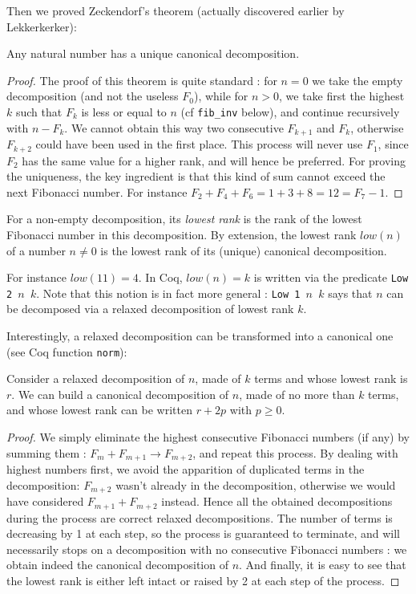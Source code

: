 \documentclass[a4paper,11pt]{article}
\begin{document}
Then we proved Zeckendorf's theorem (actually discovered earlier by Lekkerkerker):

\begin{theorem}[Zeckendorf]\label{zeck}
Any natural number has a unique canonical decomposition.
\end{theorem}

\begin{proof}
The proof of this theorem is quite standard : for $n=0$ we take
the empty decomposition (and not the useless $F_0$), while for
$n>0$, we take first the highest $k$ such that $F_k$ is less or equal to $n$
(cf {\tt fib\_inv} below),
and continue recursively with $n-F_k$. We cannot obtain this way
two consecutive $F_{k+1}$ and $F_k$, otherwise $F_{k+2}$ could have
been used in the first place. This process will never use $F_1$,
since $F_2$ has the same value for a higher rank, and will hence
be preferred.
For proving the uniqueness, the key ingredient is that this kind of
sum cannot exceed the next Fibonacci number. For instance
$F_2+F_4+F_6 = 1+3+8 = 12 = F_7 - 1$.
\end{proof}

\begin{definition}
For a non-empty decomposition, its \emph{lowest rank} is the rank of
the lowest Fibonacci number in this decomposition. By extension,
the lowest rank $low(n)$ of a number $n\neq 0$ is the lowest
rank of its (unique) canonical decomposition.
\end{definition}
For instance $low(11)=4$. In Coq, $low(n)=k$ is written
via the predicate {\tt Low 2 $n$ $k$}. Note that this notion is
in fact more general : {\tt Low 1 $n$ $k$} says that $n$ can be
decomposed via a relaxed decomposition of lowest rank $k$.

Interestingly, a relaxed decomposition can be transformed into
a canonical one (see Coq function {\tt norm}):

\begin{theorem}[normalization]\label{norm}
Consider a relaxed decomposition of $n$, made of $k$ terms and
whose lowest rank is $r$. We can build a canonical decomposition
of $n$, made of no more than $k$ terms, and whose lowest rank can
be written $r+2p$ with $p\ge 0$.  
\end{theorem}
\begin{proof}
We simply eliminate the highest consecutive Fibonacci numbers (if any)
by summing them : $F_m+F_{m+1} \to F_{m+2}$, and repeat this
process. By dealing with highest numbers first, we avoid the apparition of
duplicated terms in the decomposition: $F_{m+2}$ wasn't already
in the decomposition, otherwise we would have considered
$F_{m+1}+F_{m+2}$ instead. Hence all the obtained decompositions
during the process are correct relaxed decompositions. The number of
terms is decreasing by 1 at each step, so the process is guaranteed to
terminate, and will necessarily stops on a decomposition with no
consecutive Fibonacci numbers : we obtain indeed the canonical
decomposition of $n$. And finally, it is easy to see that the
lowest rank is either left intact or raised by 2 at each step
of the process.
\end{proof}
\end{document}
